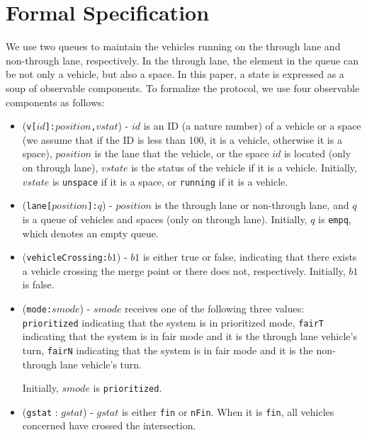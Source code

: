 \documentclass[10pt, conference, compsocconf]{IEEEtran}
\begin{document}
\section{Formal Specification}
 \label{sect_formal}
 We use two queues to maintain the vehicles running on the through lane and non-through lane, respectively.
 In the through lane, the element in the queue can be not only a vehicle, but also a space.
 In this paper, a state is expressed as a soup of observable components.
 To formalize the protocol, we use four observable components as follows:
 \begin{itemize}
    \item (\verb!v[!$id$\verb!]:!$position$\verb!,!$vstat$) - $id$ is an ID (a nature number) of 
    a vehicle or a space (we assume that if the ID is less than 100, it is a vehicle, otherwise it is a space), 
    $position$ is the lane that the vehicle, or the space $id$ is located 
    (only on through lane), $vstate$ is the status of the vehicle if it is a 
    vehicle. Initially, $vstate$ is \verb!unspace! if it is a space, or \verb!running! if it is a vehicle.
    \item (\verb!lane[!$position$\verb!]:!$q$) - $position$ is the through lane or 
    non-through lane, and $q$ is a queue of vehicles and spaces (only on through lane). 
    Initially, $q$ is \verb!empq!, which denotes an empty queue.
     
    \item (\verb!vehicleCrossing:!$b1$) - $b1$ is either true or false, indicating that there 
    exists a vehicle crossing the merge point or there does not, respectively. Initially, $b1$ is false.
   
    \item (\verb!mode:!$smode$) - $smode$ receives one of the following three values: 
   \verb!prioritized! indicating that the system is in prioritized mode, 
   \verb!fairT! indicating that the system is in fair mode and it is the through lane vehicle's turn,
   \verb!fairN! indicating that the system is in fair mode and it is the non-through lane vehicle's turn.
    
   Initially, $smode$ is \verb!prioritized!.
   
    \item (\verb!gstat! : $gstat$) -  $gstat$ is either \verb!fin! or \verb!nFin!.
    When it is \verb!fin!, all vehicles concerned have crossed the intersection.
 \end{itemize}
 
\end{document}
